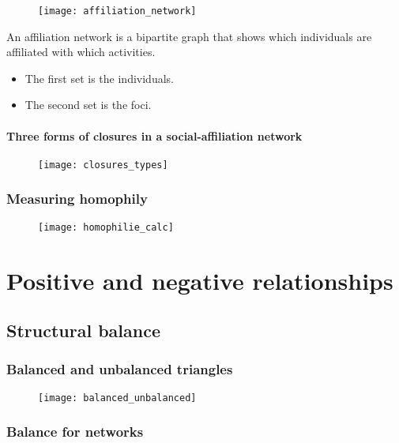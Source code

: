 \begin{figure}[H]
    \centering
    \texttt{[image: affiliation\_network]}
\end{figure}

An affiliation network is a bipartite graph that shows which individuals are affiliated with which activities.
\begin{itemize}
\item The first set is the individuals.
\item The second set is the foci.
\end{itemize}

\subsubsection{Three forms of closures in a social-affiliation network}

\begin{figure}[H]
    \centering
    \texttt{[image: closures\_types]}
\end{figure}

\subsection{Measuring homophily}

\begin{figure}[H]
    \centering
    \texttt{[image: homophilie\_calc]}
\end{figure}

\chapter{Positive and negative relationships}

\section{Structural balance}

\subsection{Balanced and unbalanced triangles}

\begin{figure}[H]
    \centering
    \texttt{[image: balanced\_unbalanced]}
\end{figure}

\subsection{Balance for networks}

